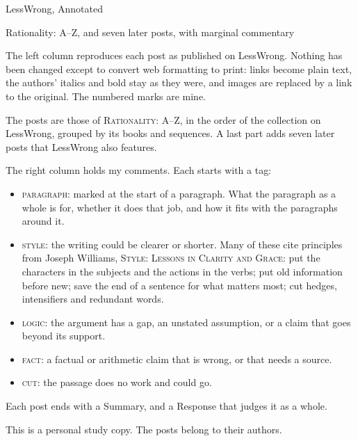 



{\noindent\LARGE LessWrong, Annotated\par}\medskip
{\noindent\large Rationality: A--Z, and seven later posts, with marginal commentary\par}\bigskip

\begin{minipage}{0.6\textwidth}
\setlength{\parskip}{0.7\baselineskip}
The left column reproduces each post as published on LessWrong. Nothing has been changed except to convert web formatting to print: links become plain text, the authors' italics and bold stay as they were, and images are replaced by a link to the original. The numbered marks are mine.

The posts are those of \textsc{Rationality: A--Z}, in the order of the collection on LessWrong, grouped by its books and sequences. A last part adds seven later posts that LessWrong also features.

The right column holds my comments. Each starts with a tag:

\begin{itemize}
\item \textsc{paragraph}: marked at the start of a paragraph. What the paragraph as a whole is for, whether it does that job, and how it fits with the paragraphs around it.
\item \textsc{style}: the writing could be clearer or shorter. Many of these cite principles from Joseph Williams, \textsc{Style: Lessons in Clarity and Grace}: put the characters in the subjects and the actions in the verbs; put old information before new; save the end of a sentence for what matters most; cut hedges, intensifiers and redundant words.
\item \textsc{logic}: the argument has a gap, an unstated assumption, or a claim that goes beyond its support.
\item \textsc{fact}: a factual or arithmetic claim that is wrong, or that needs a source.
\item \textsc{cut}: the passage does no work and could go.
\end{itemize}

Each post ends with a Summary, and a Response that judges it as a whole.

This is a personal study copy. The posts belong to their authors.
\end{minipage}


